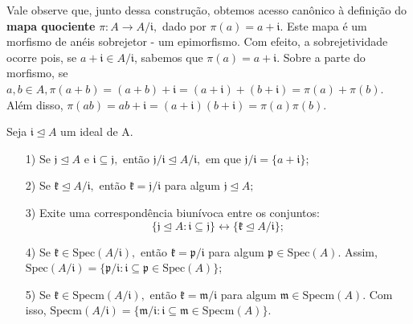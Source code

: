 \documentclass[AlgebraII/algebraII_notes.tex]{subfiles}
\begin{document}
Vale observe que, junto dessa construção, obtemos acesso canônico à definição do \textbf{mapa quociente} \(\pi :A\rightarrow A/\mathfrak{i},\)
dado por \(\pi(a) = a + \mathfrak{i}.\) Este mapa é um morfismo de anéis sobrejetor - um epimorfismo.
Com efeito, a sobrejetividade ocorre pois, se \(a+\mathfrak{i}\in A/\mathfrak{i}\), sabemos que \(\pi(a)= a + \mathfrak{i}.\)
Sobre a parte do morfismo, se \(a, b\in A, \pi (a+b) = (a+b)+\mathfrak{i} = (a+\mathfrak{i})+(b+\mathfrak{i}) = \pi(a) + \pi(b)\).
Além disso, \(\pi (ab) = ab + \mathfrak{i} = (a+\mathfrak{i})(b+\mathfrak{i}) = \pi (a)\pi (b).\)
\begin{prop*}
	Seja \(\mathfrak{i}\trianglelefteq{A}\) um ideal de A.
	\begin{itemize}
		\item[1)] Se \(\mathfrak{j}\trianglelefteq{A}\) e \(\mathfrak{i}\subseteq{\mathfrak{j}}, \) então \(\mathfrak{j}/\mathfrak{i}\trianglelefteq{A/\mathfrak{i}},\) em que
		      \(\mathfrak{j}/\mathfrak{i}=\{a+\mathfrak{i}\}\);
		\item[2)] Se \(\mathfrak{k}\trianglelefteq{A/\mathfrak{i}},\) então \(\mathfrak{k}=\mathfrak{j}/\mathfrak{i}\) para algum \(\mathfrak{j}\trianglelefteq{A};\)
		\item[3)] Exite uma correspondência biunívoca entre os conjuntos:
		      \[
			      \biggl\{\mathfrak{j}\trianglelefteq{A}: \mathfrak{i}\subseteq{\mathfrak{j}}\biggr\}\longleftrightarrow \biggl\{\mathfrak{k}\trianglelefteq{A/\mathfrak{i}}\biggr\};
		      \]
		\item[4)] Se \(\mathfrak{k}\in \mathrm{Spec}(A/\mathfrak{i}),\) então \(\mathfrak{k} = \mathfrak{p}/\mathfrak{i}\) para algum \(\mathfrak{p}\in \mathrm{Spec}(A).\)
		      Assim, \(\mathrm{Spec}(A/\mathfrak{i}) = \{\mathfrak{p}/\mathfrak{i}:\mathfrak{i}\subseteq{\mathfrak{p}}\in \mathrm{Spec}(A)\}\);
		\item[5)] Se \(\mathfrak{k}\in \mathrm{Specm}(A/\mathfrak{i}),\) então \(\mathfrak{k} = \mathfrak{m}/\mathfrak{i}\) para algum \(\mathfrak{m}\in \mathrm{Specm}(A).\)
		      Com isso, \(\mathrm{Specm}(A/\mathfrak{i}) = \{\mathfrak{m}/\mathfrak{i}: \mathfrak{i}\subseteq{\mathfrak{m}}\in \mathrm{Specm}(A)\}.\)
	\end{itemize}
\end{prop*}
\end{document}
